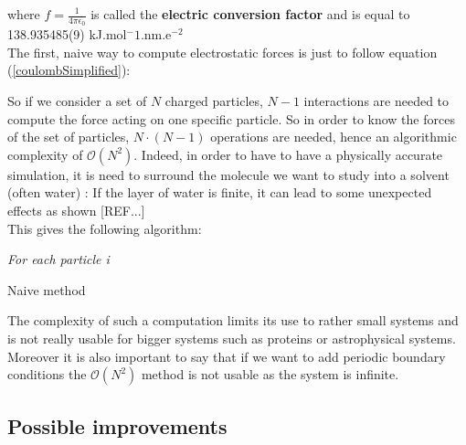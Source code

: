 \documentclass[10pt,twoside,a4paper]{report}
\begin{document}
where $f=\frac{1}{4\pi\epsilon_0}$ is called the \textbf{electric conversion factor} and is equal to 138.935485(9) kJ.mol$^-1$.nm.e$^{-2}$\\


The first, naive way to compute electrostatic forces is just to follow equation (\ref{coulombSimplified}):

So if we consider a set of $N$ charged particles, $N-1$ interactions are needed to compute the force acting on one specific particle. So in order to know the forces of the set of particles, $N\cdot(N-1)$ operations are needed, hence an algorithmic complexity of $\mathcal{O}(N^2)$. Indeed, in order to have to have a physically accurate simulation, it is need to surround the molecule we want to study into a solvent (often water) : If the layer of water is finite, it can lead to some unexpected effects as shown [REF...]\\

This gives the following algorithm:

\IncMargin{1em}
\begin{algorithm}[H]



\BlankLine

\emph{For each particle i}\;
\caption{Naive method}\label{algo_disjdecomp}
\end{algorithm}\DecMargin{1em}


The complexity of such a computation limits its use to rather small systems and is not really usable for bigger systems such as proteins or astrophysical systems.
 Moreover it is also important to say that if we want to add periodic boundary conditions the $\mathcal{O}(N^2)$ method is not usable as the system is infinite.


\subsection{Possible improvements}
\end{document}
